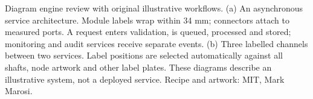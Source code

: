 \caption{Diagram engine review with original illustrative workflows. (a) An asynchronous service architecture. Module labels wrap within 34 mm; connectors attach to measured ports. A request enters validation, is queued, processed and stored; monitoring and audit services receive separate events. (b) Three labelled channels between two services. Label positions are selected automatically against all shafts, node artwork and other label plates. These diagrams describe an illustrative system, not a deployed service. Recipe and artwork: MIT, Mark Marosi.}
